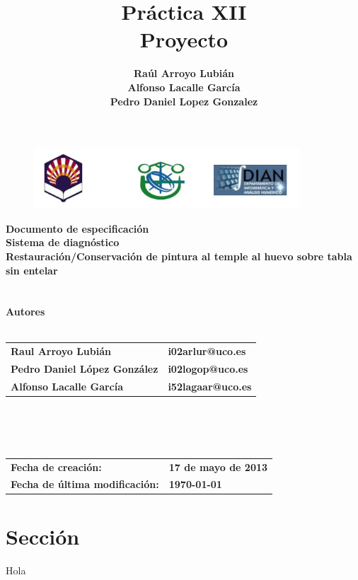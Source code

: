 \documentclass[a4paper,11pt]{article}
\title
{
    \textbf{Práctica XII}\\
    \textbf{Proyecto}
}
\author
{
 	\textbf{Raúl Arroyo Lubián}\\
    \textbf{Alfonso Lacalle García}\\
    \textbf{Pedro Daniel Lopez Gonzalez}
}
\begin{document}
	\begin{titlepage}
		\begin{center}
			\begin{figure}
				\includegraphics[width=375px]{Universidad.png} 
			\end{figure}
			\textbf{\LARGE Documento de especificación}\\
			\textbf{\Large Sistema de diagnóstico}\\
			\textbf{Restauración/Conservación de pintura al temple al huevo sobre tabla
			sin entelar}\\
			\\
			\textbf{}
			\\
			\textbf{Autores}
			\\
			\textbf{}
			\\
			\begin{tabular}{l l}
				\textbf{Raul Arroyo Lubián} & \textbf{i02arlur@uco.es} \\	
				\textbf{Pedro Daniel López González} & \textbf{i02logop@uco.es} \\
				\textbf{Alfonso Lacalle García} & \textbf{i52lagaar@uco.es} \\
			\end{tabular}
			\\
			\textbf{}
			\\
			\textbf{}
			\\
			\begin{tabular}{l l}
				\textbf{Fecha de creación:} & \textbf{17 de mayo de 2013} \\
				\textbf{Fecha de última modificación:} & \textbf{\today } \\
			\end{tabular}
		\end{center}
    \end{titlepage}
	\newpage
	\tableofcontents
	\newpage
	\section{Sección}
    Hola
\end{document}
